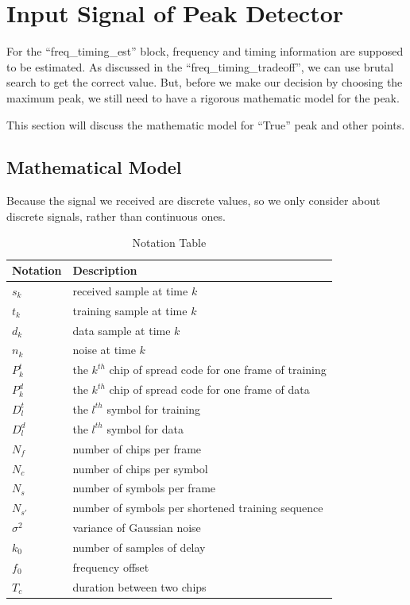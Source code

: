 \documentclass[a4paper]{report}
\begin{document}
\section{Input Signal of Peak Detector} %
\label{sec:input_signal_of_peak_detector}
For the ``freq\_timing\_est'' block, frequency and timing information are supposed to be estimated. As discussed in the ``freq\_timing\_tradeoff'', we can use brutal search to get the correct value. But, before we make our decision by choosing the maximum peak, we still need to have a rigorous mathematic model for the peak. 

This section will discuss the mathematic model for ``True'' peak and other points.


\subsection{Mathematical Model} %
\label{sub:mathematical_model}
Because the signal we received are discrete values, so we only consider about discrete signals, rather than continuous ones.

\begin{table}[ht]
\centering
\begin{tabular}{l l}
 \toprule
 Notation 	& 	Description\\
 \midrule
 $s_k$		& 	received sample at time $k$\\
 $t_k$		& 	training sample at time $k$\\
 $d_k$		& 	data sample at time $k$\\
 $n_k$		& 	noise at time $k$\\
 $P^t_k$ & 	the $k^{th}$ chip of spread code for one frame of training\\
 $P^d_k$	& 	the $k^{th}$ chip of spread code for one frame of data\\
 $D^t_l$ & 	the $l^{th}$ symbol for training\\
 $D^d_l$ & 	the $l^{th}$ symbol for data\\
 $N_f$ 		& 	number of chips per frame\\
 $N_c$ 		& 	number of chips per symbol\\
 $N_s$		& 	number of symbols per frame\\
 $N_{s'}$ 	& 	number of symbols per shortened training sequence\\
 $\sigma^2$ & 	variance of Gaussian noise\\
 $k_0$ 		& 	number of samples of delay\\
 $f_0$ 		& 	frequency offset\\
 $T_c$ 		& 	duration between two chips\\
 \bottomrule
\end{tabular}
\caption{Notation Table}
\label{Table:Notation Table}
\end{table}
\end{document}
